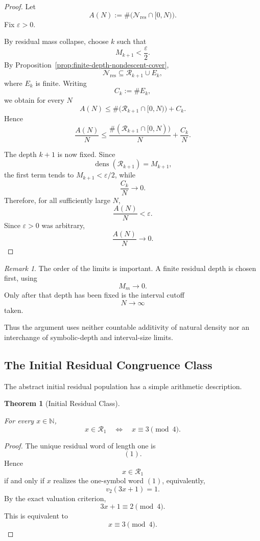 \documentclass[12pt, oneside]{article}
\numberwithin{equation}{section}
\theoremstyle{definition}
\theoremstyle{plain}
\newtheorem{theorem}{Theorem}[section]
\theoremstyle{remark}
\newtheorem*{remark}{Remark}
\begin{document}
\begin{proof}
Let
\[
A(N)
:=
\#\bigl(\mathcal N_{\mathrm{res}}\cap[0,N)\bigr).
\]
Fix \(\varepsilon>0\).

By residual mass collapse, choose \(k\) such that
\[
M_{k+1}<\frac{\varepsilon}{2}.
\]
By Proposition~\ref{prop:finite-depth-nondescent-cover},
\[
\mathcal N_{\mathrm{res}}
\subseteq
\mathcal R_{k+1}\cup E_k,
\]
where \(E_k\) is finite. Writing
\[
C_k:=\#E_k,
\]
we obtain for every \(N\)
\[
A(N)
\le
\#\bigl(\mathcal R_{k+1}\cap[0,N)\bigr)+C_k.
\]
Hence
\[
\frac{A(N)}{N}
\le
\frac{\#(\mathcal R_{k+1}\cap[0,N))}{N}
+
\frac{C_k}{N}.
\]

The depth \(k+1\) is now fixed. Since
\[
\operatorname{dens}(\mathcal R_{k+1})
=
M_{k+1},
\]
the first term tends to \(M_{k+1}<\varepsilon/2\), while
\[
\frac{C_k}{N}\longrightarrow0.
\]
Therefore, for all sufficiently large \(N\),
\[
\frac{A(N)}{N}<\varepsilon.
\]
Since \(\varepsilon>0\) was arbitrary,
\[
\frac{A(N)}{N}\longrightarrow0.
\]
\end{proof}

\begin{remark}
The order of the limits is important. A finite residual depth is chosen
first, using
\[
M_m\longrightarrow0.
\]
Only after that depth has been fixed is the interval cutoff
\[
N\longrightarrow\infty
\]
taken.

Thus the argument uses neither countable additivity of natural density nor
an interchange of symbolic-depth and interval-size limits.
\end{remark}

\subsection{The Initial Residual Congruence Class}

The abstract initial residual population has a simple arithmetic
description.

\begin{theorem}[Initial Residual Class]
\label{thm:initial-residual-mod-four}

For every \(x\in\mathbb N\),
\[
\boxed{
x\in\mathcal R_1
\quad\Longleftrightarrow\quad
x\equiv3\pmod4.
}
\]
\end{theorem}

\begin{proof}
The unique residual word of length one is
\[
(1).
\]
Hence
\[
x\in\mathcal R_1
\]
if and only if \(x\) realizes the one-symbol word \((1)\), equivalently,
\[
v_2(3x+1)=1.
\]
By the exact valuation criterion,
\[
3x+1\equiv2\pmod4.
\]
This is equivalent to
\[
x\equiv3\pmod4.
\]
\end{proof}
\end{document}
